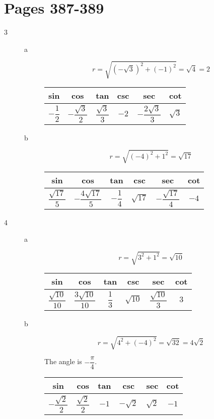 \documentclass[fleqn,addpoints]{exam}
\begin{document}
\section{Pages 387-389}
\begin{description}

\item[3]
\begin{description}
\item[a]
\[
  r = \sqrt{\left( -\sqrt{3} \right)^2 + (-1)^2} = \sqrt{4} = 2
\]

\begin{tabular}{cccccc}
\toprule
sin & cos & tan & csc & sec & cot \\
\midrule
  $-\dfrac{1}{2}$ &  $- \dfrac{\sqrt{3}}{2}$ & $\dfrac{\sqrt{3}}{3}$ & $-2$ & $-\dfrac{2 \sqrt{3}}{3}$ & $\sqrt{3}$ \\
\bottomrule
\end{tabular}

\item[b]
\[
  r = \sqrt{(-4)^2 + 1^2} = \sqrt{17}
\]

\begin{tabular}{cccccc}
\toprule
sin & cos & tan & csc & sec & cot \\
\midrule
  $\dfrac{\sqrt{17}}{5}$ &  $- \dfrac{4\sqrt{17}}{5}$ & $-\dfrac{1}{4}$ & $\sqrt{17}$ & $-\dfrac{\sqrt{17}}{4}$ & $-4$ \\
\bottomrule
\end{tabular}


\end{description}

\item[4]
\begin{description}
\item[a]
\[
  r = \sqrt{3^2 + 1^2} = \sqrt{10}
\]

\begin{tabular}{cccccc}
\toprule
sin & cos & tan & csc & sec & cot \\
\midrule
  $\dfrac{\sqrt{10}}{10}$ &  $\dfrac{3 \sqrt{10}}{10}$ & $\dfrac{1}{3}$ & $\sqrt{10}$ & $\dfrac{\sqrt{10}}{3}$ & $3$ \\
\bottomrule
\end{tabular}

\item[b]
\[
  r = \sqrt{4^2 + (-4)^2} = \sqrt{32} = 4 \sqrt{2}
\]

The angle is $-\dfrac{\pi}{4}$.

\begin{tabular}{cccccc}
\toprule
sin & cos & tan & csc & sec & cot \\
\midrule
  $-\dfrac{\sqrt{2}}{2}$ &  $\dfrac{\sqrt{2}}{2}$ & $-1$ & $- \sqrt{2}$ & $\sqrt{2}$ & $-1$ \\
\bottomrule
\end{tabular}


\end{description}
\end{description}
\end{document}
